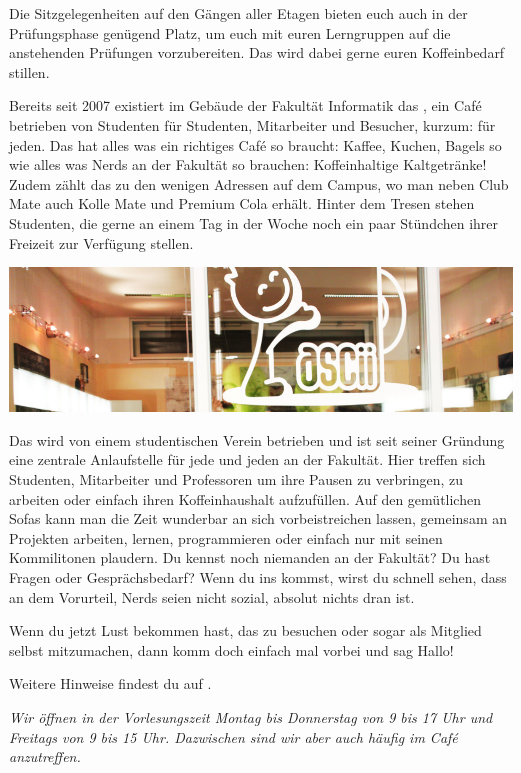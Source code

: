 Die Sitzgelegenheiten auf den Gängen aller Etagen bieten euch auch in der Prüfungsphase genügend Platz, um euch mit euren Lerngruppen auf die anstehenden Prüfungen vorzubereiten. Das \ascii{} wird dabei gerne euren Koffeinbedarf stillen.


Bereits seit 2007 existiert im Gebäude der Fakultät Informatik das \ascii{}, ein Café betrieben von Studenten für Studenten, Mitarbeiter und Besucher, kurzum: für jeden.
Das \ascii{} hat alles was ein richtiges Café so braucht: Kaffee, Kuchen, Bagels so wie alles was Nerds an der Fakultät so brauchen: Koffeinhaltige Kaltgetränke!
Zudem zählt das \ascii{} zu den wenigen Adressen auf dem Campus, wo man neben Club Mate auch Kolle Mate und Premium Cola erhält.
Hinter dem Tresen stehen Studenten, die gerne an einem Tag in der Woche noch ein paar Stündchen ihrer Freizeit zur Verfügung stellen.

\includegraphics[width=\linewidth]{img/ascii.jpg}

Das \ascii{} wird von einem studentischen Verein betrieben und ist seit seiner Gründung eine zentrale Anlaufstelle für jede und jeden an der Fakultät.
Hier treffen sich Studenten, Mitarbeiter und Professoren um ihre Pausen zu verbringen,
zu arbeiten oder einfach ihren Koffeinhaushalt aufzufüllen.
Auf den gemütlichen Sofas kann man die Zeit wunderbar an sich vorbeistreichen lassen,
gemeinsam an Projekten arbeiten, lernen, programmieren oder einfach nur mit seinen Kommilitonen plaudern.
Du kennst noch niemanden an der Fakultät?
Du hast Fragen oder Gesprächsbedarf?
Wenn du ins \ascii{} kommst, wirst du schnell sehen, dass an dem Vorurteil, Nerds seien nicht sozial, absolut nichts dran ist.

Wenn du jetzt Lust bekommen hast, das \ascii{} zu besuchen oder sogar als Mitglied selbst mitzumachen, dann komm doch einfach mal vorbei und sag Hallo!

Weitere Hinweise findest du auf .

\textit{Wir öffnen in der Vorlesungszeit Montag bis Donnerstag von 9 bis 17 Uhr und Freitags von 9 bis 15 Uhr. Dazwischen sind wir aber auch häufig im Café anzutreffen.}


\pagebreak

\
\thispagestyle{empty}
